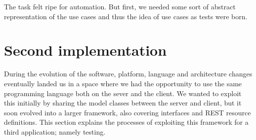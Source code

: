 The task felt ripe for automation. But first, we needed some sort of abstract representation of the use cases and thus the idea of use cases as tests were born.

\section{Second implementation}
During the evolution of the software, platform, language and architecture changes eventually landed us in a space where we had the opportunity to use the same programming language both on the sever and the client. We wanted to exploit this initially by sharing the model classes between the server and client, but it soon evolved into a larger framework, also covering interfaces and REST resource definitions. This section explains the processes of exploiting this framework for a third application; namely testing.


